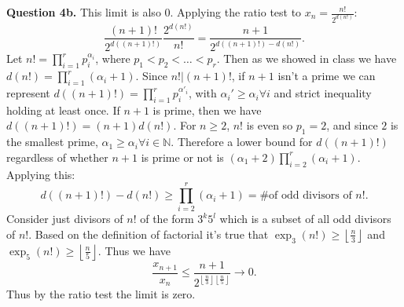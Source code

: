 \documentclass[letterpaper, reqno,11pt]{article}
\begin{document}
{\medskip\noindent\bf Question 4b.} This limit is also 0. Applying the ratio test to $x_n= \frac{n!}{2^{d(n!)}}$:
\[
\frac{(n+1)!}{2^{d((n+1)!)}} \frac{2^{d(n!)}}{n!}= \frac{n+1}{2^{d((n+1)!)-d(n!)}}
.\]
Let $n!=\prod_{i=1}^{r}p_i^{\alpha_i}$, where $p_1<p_2<\ldots<p_r$. Then as we showed in class we have $d(n!)=\prod_{i=1}^{r}(\alpha_i+1)$. Since $n!|(n+1)!$, if $n+1$ isn't a prime we can represent $d((n+1)!)=\prod_{i=1}^{r}p_i^{\alpha'_i}$, with $\alpha_i'\geq\alpha_i\forall i$ and strict inequality holding at least once. If $n+1$ is prime, then we have $d((n+1)!)=(n+1)d(n!)$. For $n\geq 2$, $n!$ is even so $p_1=2$, and since $2$ is the smallest prime, $\alpha_1\geq \alpha_i\forall i\in \mathbb{N}$. Therefore a lower bound for $d((n+1)!)$ regardless of whether $n+1$ is prime or not is $(\alpha_1+2)\prod_{i=2}^{r}(\alpha_i+1)$. Applying this:
\[
d((n+1)!)-d(n!)\geq \prod_{i=2}^{r}(\alpha_i+1)=\text{\# of odd divisors of $n!$}
.\]
Consider just divisors of $n!$ of the form $3^{k}5^{l}$ which is a subset of all odd divisors of $n!$. Based on the definition of factorial it's true that $\exp_3(n!)\geq \left\lfloor \frac{n}{3} \right\rfloor$ and $\exp_5(n!)\geq \left\lfloor \frac{n}{5} \right\rfloor$. Thus we have
\[
    \frac{x_{n+1}}{x_{n}}\leq \frac{n+1}{2^{\left\lfloor \frac{n}{3} \right\rfloor\left\lfloor \frac{n}{5} \right\rfloor}}\to 0
.\]
Thus by the ratio test the limit is zero.
\end{document}
